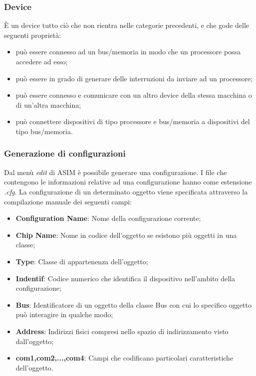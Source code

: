 \subsubsection{Device}
\uppercase{è} un device tutto ciò che non rientra nelle categorie precedenti, e che gode delle seguenti proprietà:

\begin{itemize}
    \item può essere connesso ad un bus/memoria in modo che un processore possa accedere ad esso;
    \item può essere in grado di generare delle interruzioni da inviare ad un processore;
    \item  può essere connesso e comunicare con un altro device della stessa macchina o di un'altra macchina;
    \item può connettere dispositivi di tipo processore e bus/memoria a dispositivi del tipo bus/memoria.
\end{itemize}


\subsubsection{Generazione di configurazioni}
Dal menù \textit{edit} di ASIM è possibile generare una configurazione. I file che contengono le informazioni relative ad una configurazione hanno come estensione \textit{.cfg}.
La configurazione di un determinato oggetto viene specificata attraverso la compilazione manuale dei seguenti campi:

\begin{itemize}
    \item \textbf{Configuration Name}: Nome della configurazione corrente;
    \item \textbf{Chip Name}: Nome in codice dell'oggetto se esistono più oggetti in una classe;
    \item \textbf{Type}: Classe di appartenenza dell'oggetto;
    \item \textbf{Indentif}: Codice numerico che identifica il dispositivo nell'ambito della configurazione;
    \item \textbf{Bus}: Identificatore di un oggetto della classe Bus con cui lo specifico oggetto può interagire in qualche modo;
    \item \textbf{Address}: Indirizzi fisici compresi nello spazio di indirizzamento visto dall'oggetto;
    \item \textbf{com1,com2,...,com4}: Campi che codificano particolari caratteristiche dell'oggetto. 
\end{itemize}

